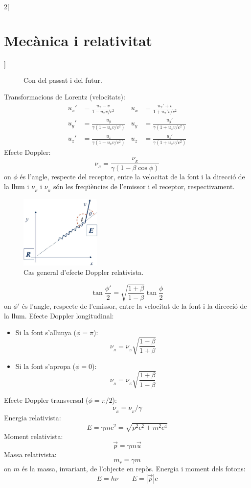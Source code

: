 \documentclass[class=article,10pt,crop=false]{standalone}
\begin{document}
\begin{multicols}{2}[\section{Mecànica i relativitat}]
\begin{figure}[ht]
    \caption{Con del passat i del futur.}
\end{figure}
Transformacions de Lorentz (velocitats):
\begin{align*}
    u_x'&=\frac{u_x-v}{1-u_xv/c^2} & u_x&=\frac{u_x'+v}{1+u_x'v/c^2}\\
    u_y'&=\frac{u_y}{\gamma \left(1-u_xv/c^2\right)} & u_y&=\frac{u_y'}{\gamma \left(1+u_xv/c^2\right)}\\
    u_z'&=\frac{u_z}{\gamma \left(1-u_xv/c^2\right)} & u_z&=\frac{u_z'}{\gamma \left(1+u_xv/c^2\right)}
\end{align*}
Efecte Doppler:
$$\nu_{\!_R}=\frac{\nu_{\!_E}}{\gamma(1-\beta\cos\phi)}$$
{on $\phi$ és l'angle, respecte del receptor, entre la ve\-lo\-ci\-tat de la font i la direcció de la llum i $\nu_{\!_E}$ i $\nu_{\!_R}$ són les freqüències de l'emissor i el receptor, respectivament.}\newline
\begin{figure}[ht]
    \centering
    \includegraphics[width=4cm]{Physics/1st/Mecanica_i_relativitat/Imatges/dop.jpg}
    \caption{Cas general d'efecte Doppler relativista.}
\end{figure}
$$\tan\frac{\phi'}{2}=\sqrt{\frac{1+\beta}{1-\beta}}\tan\frac{\phi}{2}$$
{on $\phi'$ és l'angle, respecte de l'emissor, entre la velocitat de la font i la direcció de la llum.} \newline
Efecte Doppler longitudinal:
\begin{itemize}
    \item Si la font s'allunya ($\phi=\pi$):
   $$\nu_{\!_R}=\nu_{\!_E}\sqrt{\frac{1-\beta}{1+\beta}}$$
   \item Si la font s'apropa ($\phi=0$):
   $$\nu_{\!_R}=\nu_{\!_E}\sqrt{\frac{1+\beta}{1-\beta}}$$
\end{itemize}
Efecte Doppler transversal ($\phi=\pi/2$):
$$\nu_{\!_R}=\nu_{\!_E}/\gamma$$
Energia relativista:
$$E=\gamma mc^2=\sqrt{p^2c^2+m^2c^4}$$
Moment relativista:
$$\vec{p}=\gamma m\vec{u}$$
Massa relativista:
$$m_r=\gamma m$$ {on $m$ és la massa, invariant, de l'objecte en repòs.}\newline
Energia i moment dels fotons:
$$E=h\nu\qquad E=|\vec{p}|c$$

\end{multicols}
\end{document}
